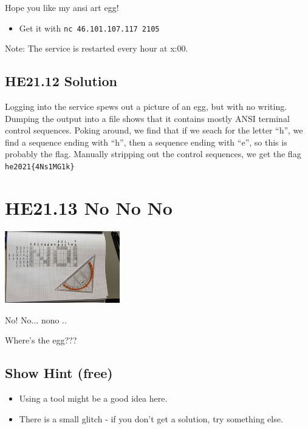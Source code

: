 \documentclass[english,a4paper,nols,noindent]{tufte-handout}
\begin{document}
Hope you like my ansi art egg!

\begin{itemize}
\item Get it with \verb+nc 46.101.107.117 2105+
\end{itemize}
Note: The service is restarted every hour at x:00.

\hypertarget{he21.12-solution}{%
\subsection{HE21.12 Solution}\label{he21.12-solution}}

Logging into the service spews out a picture of an egg, but with no
writing.  Dumping the output into a file shows that it contains mostly
ANSI terminal control sequences.  Poking around, we find that if we
seach for the letter ``h'', we find a sequence ending with ``h'', then
a sequence ending with ``e'', so this is probably the flag.  Manually
stripping out the control sequences, we get the flag
\verb+he2021{4Ns1MG1k}+


\hypertarget{he21.13}{%
  \section{HE21.13 No No No}
  \label{he21.13}}
\begin{marginfigure}
    \includegraphics[width=50mm]{images/challenge13.jpg}
\end{marginfigure}

\noindent No! No... nono ..

\noindent Where's the egg???

\subsection{Show Hint (free)}
\begin{itemize}
\item Using a tool might be a good idea here.
\item There is a small glitch - if you don't get a solution, try something else.
\end{itemize}
\end{document}
